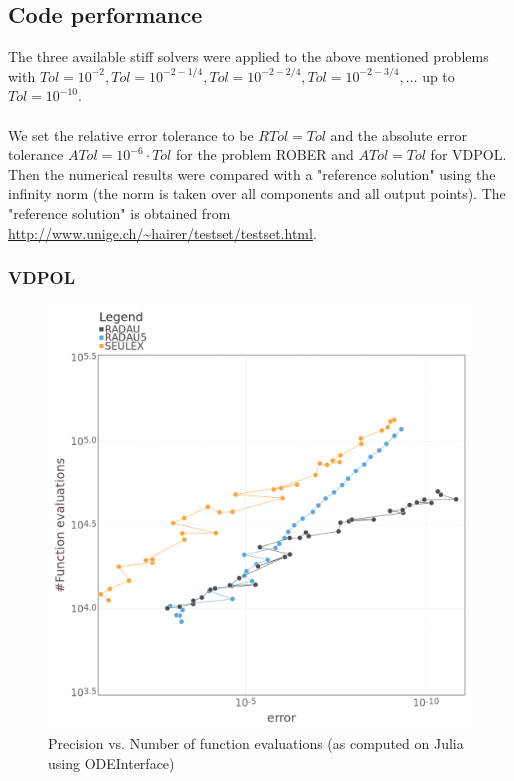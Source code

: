 \documentclass[notitlepage,12pt]{article}
\begin{document}
\newpage

\subsection{Code performance}
\label{sec:codePerfStiff}

The three available stiff solvers were applied to the above mentioned problems with $Tol = 10^{-2} , Tol = 10^{-2-1/4} , Tol = 10^{-2-2/4}, Tol = 10^{-2-3/4},\ldots$ up to $Tol = 10^{-10}$.\\ \\
We set the relative error tolerance to be $RTol=Tol$ and the absolute error tolerance $ATol =10^{-6}\cdot Tol$ for the problem ROBER and $ATol = Tol$ for VDPOL. Then the numerical results were compared with a "reference solution" using the infinity norm (the norm is taken over all components and all output points). The "reference solution" is obtained from \url{http://www.unige.ch/~hairer/testset/testset.html}.

\subsubsection{VDPOL}
\begin{figure}[H]
\centering
\includegraphics[scale=0.4]{../ImagesAndPDFs/Plots/vdpolPrecisionTest.png}
\caption{Precision vs. Number of function evaluations (as computed on Julia using ODEInterface)}
\label{fig:vdpolJulia}
\end{figure}
\end{document}
